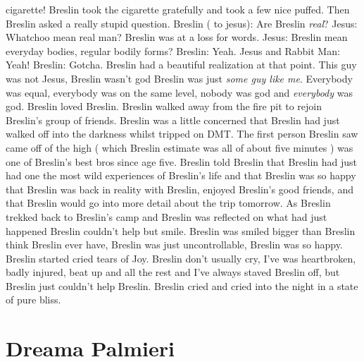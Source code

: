 \documentclass[12pt]{book}
\begin{document}
cigarette! Breslin took the cigarette gratefully and took a few nice puffed. Then Breslin asked a really stupid question. Breslin ( to jesus): Are Breslin \emph{real}? Jesus: Whatchoo mean real man? Breslin was at a loss for words. Jesus: Breslin mean everyday bodies, regular bodily forms? Breslin: Yeah. Jesus and Rabbit Man: Yeah! Breslin: Gotcha. Breslin had a beautiful realization at that point. This guy was not Jesus, Breslin wasn't god Breslin was just \emph{some guy like me}. Everybody was equal, everybody was on the same level, nobody was god and \emph{everybody} was god. Breslin loved Breslin. Breslin walked away from the fire pit to rejoin Breslin's group of friends. Breslin was a little concerned that Breslin had just walked off into the darkness whilst tripped on DMT. The first person Breslin saw came off of the high ( which Breslin estimate was all of about five minutes ) was one of Breslin's best bros since age five. Breslin told Breslin that Breslin had just had one the most wild experiences of Breslin's life and that Breslin was so happy that Breslin was back in reality with Breslin, enjoyed Breslin's good friends, and that Breslin would go into more detail about the trip tomorrow. As Breslin trekked back to Breslin's camp and Breslin was reflected on what had just happened Breslin couldn't help but smile. Breslin was smiled bigger than Breslin think Breslin ever have, Breslin was just uncontrollable, Breslin was so happy. Breslin started cried tears of Joy. Breslin don't usually cry, I've was heartbroken, badly injured, beat up and all the rest and I've always staved Breslin off, but Breslin just couldn't help Breslin. Breslin cried and cried into the night in a state of pure bliss.



\chapter{Dreama Palmieri}
\end{document}
